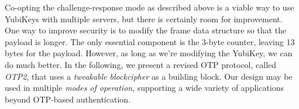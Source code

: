 \newcommand{\tsprp}{\widetilde{\notionfont{SPRP}}}
\newcommand{\calT}{\mathcal{T}}
\newcommand{\ENCO}{\oraclefont{E}}
\newcommand{\DECO}{\oraclefont{E}^{-1}}
Co-opting the challenge-response mode as described above is a viable way to
use YubiKeys with multiple servers, but there is certainly room for improvement.
%
One way to improve security is to modify the frame data structure so that the
payload is longer. The only essential component is the 3-byte counter, leaving
13 bytes for the payload.
%
However, as long as we're modifying the YubiKey, we can do much better. In the
following, we present a revised OTP protocol, called \emph{OTP2}, that uses a
\emph{tweakable blockcipher} as a building block. Our design may be used in
multiple \emph{modes of operation}, supporting a wide variety of applications
beyond OTP-based authentication.

